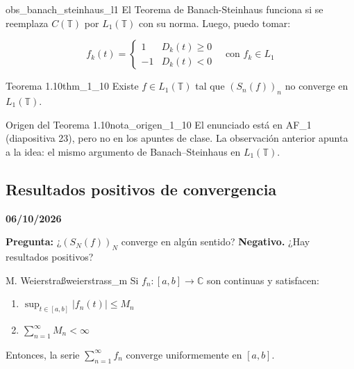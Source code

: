 \begin{observacion}{}{obs_banach_steinhaus_l1}
El Teorema de Banach-Steinhaus funciona si se reemplaza $C(\mathbb{T})$ por $L_1(\mathbb{T})$ con su norma. Luego, puedo tomar:


$$f_k(t) = \begin{cases} 1 & D_k(t) \ge 0 \\ -1 & D_k(t) < 0 \end{cases} \quad \text{con } f_k \in L_1 $$


\end{observacion}

\begin{teorema}{Teorema 1.10}{thm_1_10}
Existe $f \in L_1(\mathbb{T})$ tal que $(S_n(f))_n$ no converge en $L_1(\mathbb{T})$.
\end{teorema}

\begin{nota}{Origen del Teorema 1.10}{nota_origen_1_10}
El enunciado está en AF\_1 (diapositiva 23), pero no en los apuntes de clase. La observación anterior apunta a la idea: el mismo argumento de Banach--Steinhaus en $L_1(\mathbb{T})$.
\end{nota}

\subsection{Resultados positivos de convergencia}

\textbf{06/10/2026}

\textbf{Pregunta:} ¿$(S_N(f))_N$ converge en algún sentido? \textbf{Negativo.}
¿Hay resultados positivos?

\begin{teorema}{M. Weierstraß}{weierstrass_m}
Si $f_n: [a,b] \to \mathbb{C}$ son continuas y satisfacen:
\begin{enumerate}
\item $\sup_{t \in [a,b]} \vert{}f_n(t)\vert{} \le M_n$
\item $\sum_{n=1}^\infty M_n < \infty$
\end{enumerate}
Entonces, la serie $\sum_{n=1}^\infty f_n$ converge uniformemente en $[a,b]$.
\end{teorema}

